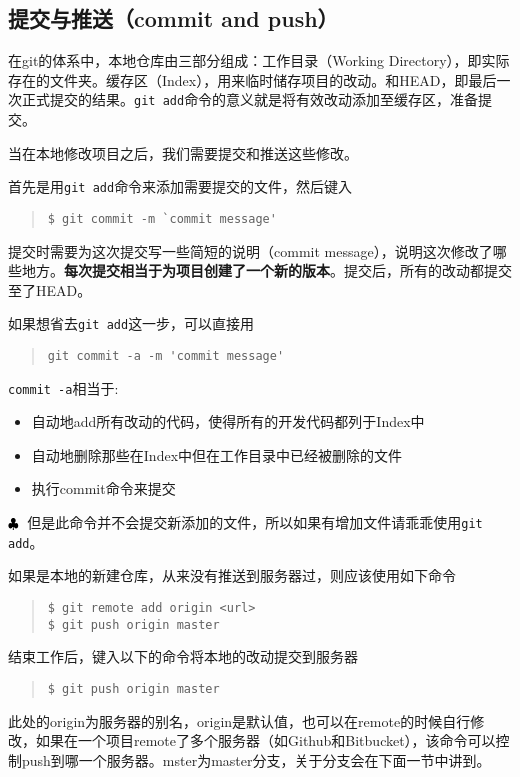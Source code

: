 \documentclass{article}
\begin{document}
		\subsection{提交与推送（commit and push）} %
		\label{sub:提交与推送_commit_and_push_}
			\par 在git的体系中，本地仓库由三部分组成：工作目录（Working Directory），即实际存在的文件夹。缓存区（Index），用来临时储存项目的改动。和HEAD，即最后一次正式提交的结果。{\tt git add}命令的意义就是将有效改动添加至缓存区，准备提交。
			\par 当在本地修改项目之后，我们需要提交和推送这些修改。
			\par 首先是用{\tt git add}命令来添加需要提交的文件，然后键入
			\begin{quote}
				\begin{lstlisting}
$ git commit -m `commit message'
				\end{lstlisting}
			\end{quote}
			提交时需要为这次提交写一些简短的说明（commit message），说明这次修改了哪些地方。{\bf 每次提交相当于为项目创建了一个新的版本}。提交后，所有的改动都提交至了HEAD。
			\par 如果想省去{\tt git add}这一步，可以直接用
			\begin{quote}
				\begin{lstlisting}
git commit -a -m 'commit message'
				\end{lstlisting}
			\end{quote}
			{\tt commit -a}相当于:
			\begin{itemize}
				\item 自动地add所有改动的代码，使得所有的开发代码都列于Index中
				\item 自动地删除那些在Index中但在工作目录中已经被删除的文件
				\item 执行commit命令来提交
			\end{itemize}
			\textcolor{red}{$\bf\clubsuit$}~但是此命令并不会提交新添加的文件，所以如果有增加文件请乖乖使用{\tt git add}。
			\par 如果是本地的新建仓库，从来没有推送到服务器过，则应该使用如下命令
			\begin{quote}
				\begin{lstlisting}
$ git remote add origin <url>
$ git push origin master
				\end{lstlisting}
			\end{quote}
			\par 结束工作后，键入以下的命令将本地的改动提交到服务器
			\begin{quote}
				\begin{lstlisting}
$ git push origin master
				\end{lstlisting}
			\end{quote}
			此处的origin为服务器的别名，origin是默认值，也可以在remote的时候自行修改，如果在一个项目remote了多个服务器（如Github和Bitbucket），该命令可以控制push到哪一个服务器。mster为master分支，关于分支会在下面一节中讲到。
\end{document}
